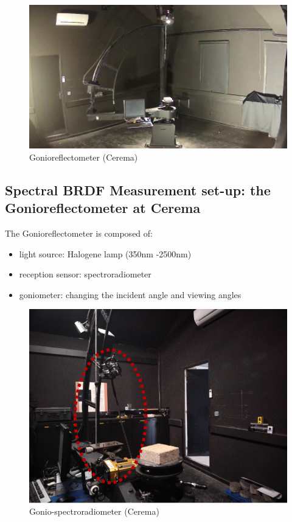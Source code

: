 \begin{figure}[!tb]
    \centering
    \includegraphics[width=0.9\linewidth]{./figures/optical-properties-of-road-surface/gonio-new.png}
    \caption{Gonioreflectometer (Cerema)}
    \label{fig:gonio}
\end{figure}

\subsection{Spectral BRDF Measurement set-up: the Gonioreflectometer at Cerema}


The Gonioreflectometer is composed of:
\begin{itemize}
    \item light source: Halogene lamp (350nm -2500nm)
    \item reception sensor: spectroradiometer
    \item goniometer: changing the incident angle and viewing angles
\end{itemize}





\begin{figure}[!tb]
    \centering
    \includegraphics[width=0.9\linewidth]{./figures/spectral-brdf-measurements/gonio-spectroradiometer.png}
    \caption{Gonio-spectroradiometer (Cerema)}
    \label{fig:gonio-spectroradiometer}
\end{figure}

